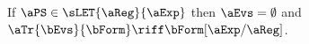 \begin{figure}

  \noindent
  If $\aPS\in\sLET{\aReg}{\aExp}$ then $\aEvs = \emptyset$ and
  $\aTr{\bEvs}{\bForm} \riff \bForm[\aExp/\aReg]$.
  \medskip


\end{figure}
